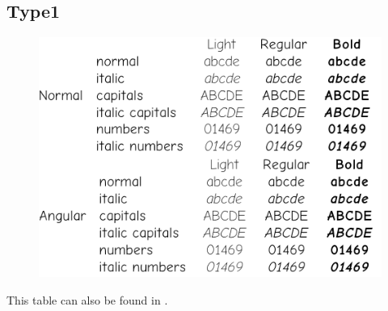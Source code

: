 \documentclass[10pt,a4paper,english,twocolumn]{article}
\begin{document}
\subsection{Type1}
\begin{figure}[ht]
	\centering
	\includegraphics[width=.7\textwidth]{comicneue-type1-specimen}
\end{figure}
This table can also be found in .
\end{document}
